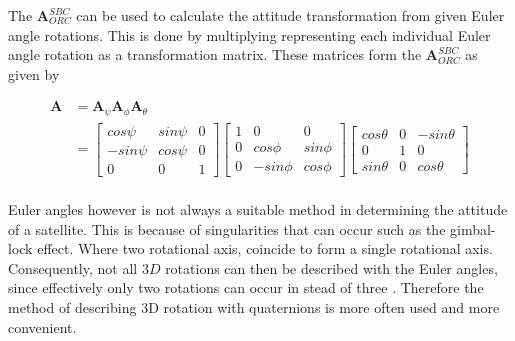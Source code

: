 The $\boldsymbol{A}^{SBC}_{ORC}$ can be used to calculate the attitude transformation from given Euler angle rotations. This is done by multiplying representing each individual Euler angle rotation as a transformation matrix. These matrices form the  $\boldsymbol{A}^{SBC}_{ORC}$ as given by 

\begin{equation}
	\begin{aligned}
		\mathbf{A} &= \mathbf{A}_{\psi} \mathbf{A}_{\phi} \mathbf{A}_{\theta} \\
			&= \begin{bmatrix}
			cos \psi & sin \psi & 0 \\
			-sin \psi & cos \psi & 0 \\
			0 & 0 & 1
			\end{bmatrix} \begin{bmatrix}
			1 & 0 & 0 \\
			0 & cos \phi & sin \phi \\
			0 & -sin \phi & cos \phi
			\end{bmatrix} \begin{bmatrix}
			cos \theta &  0 & -sin \theta \\
			0 & 1 & 0 \\
			sin \theta & 0 & cos \theta
			\end{bmatrix} \\
	\end{aligned}
\end{equation}

Euler angles however is not always a suitable method in determining the attitude of a satellite. This is because of singularities that can occur such as the gimbal-lock effect. Where two rotational axis, coincide to form a single rotational axis. Consequently, not all $3D$ rotations can then be described with the Euler angles, since effectively only two rotations can occur in stead of three \cite{diebel2006representing}. Therefore the method of describing 3D rotation with quaternions is more often used and more convenient. 

